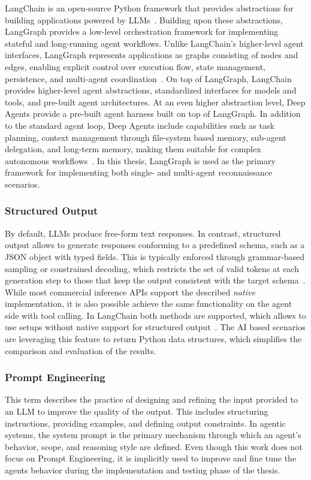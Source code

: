 LangChain is an open-source Python framework that provides abstractions for building applications powered by \glspl{LLM}~\cite{langchain_repo}.
Building upon these abstractions, LangGraph provides a low-level orchestration framework for implementing stateful and long-running agent workflows.
Unlike LangChain's higher-level agent interfaces, LangGraph represents applications as graphs consisting of nodes and edges, enabling explicit control over execution flow, state management, persistence, and multi-agent coordination~\cite{langgraph_docs}.
On top of LangGraph,
LangChain provides higher-level agent abstractions, standardized interfaces for
models and tools, and pre-built agent architectures.
At an even higher abstraction level, Deep Agents provide a pre-built agent harness built on top of LangGraph.
In addition to the standard agent loop, Deep Agents include capabilities such as task planning, context management through file-system based memory, sub-agent delegation, and long-term memory, making them suitable for complex autonomous workflows~\cite{deepagents_docs}.
In this thesis, LangGraph is used as the primary framework for implementing both single- and multi-agent reconnaissance scenarios.


\subsubsection{Structured Output}\label{subsubsec:structured-output-concept}

By default, \glspl{LLM} produce free-form text responses.
In contrast, structured output allows to generate responses conforming to a predefined schema, such as a \gls{JSON} object with typed fields.
This is typically enforced through grammar-based sampling or constrained decoding,
which restricts the set of valid tokens at each generation step to those that keep the output consistent with the target schema~\cite{langchain_structured_output}.
While most commercial inference \glspl{API} support the described \textit{native} implementation,
it is also possible achieve the same functionality on the agent side with tool calling.
In \gls{LangChain} both methods are supported,
which allows to use setups without native support for structured output~\cite{langchain_structured_output}.
The \gls{AI} based scenarios are leveraging this feature to return Python data structures,
which simplifies the comparison and evaluation of the results.

\subsubsection{Prompt Engineering}\label{subsubsec:prompt-promptengineering-concept}
This term describes the practice of designing and refining the input provided to an \gls{LLM} to improve the quality of the output.
This includes structuring instructions, providing examples, and defining output constraints.
In agentic systems, the system prompt is the primary mechanism through which an agent's behavior, scope, and reasoning style are defined.
Even though this work does not focus on Prompt Engineering,
it is implicitly used to improve and fine tune the agents behavior during the implementation and testing phase of the thesis.

